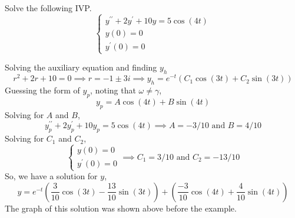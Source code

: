 \begin{example}
	Solve the following IVP.
	\begin{equation*}
		\begin{cases}
			y^{\prime\prime} + 2y^{\prime} + 10y = 5\cos{(4t)} \\
			y(0) = 0 \\
			y^\prime(0) = 0
		\end{cases}
	\end{equation*}
\end{example}
\noindent
Solving the auxiliary equation and finding $y_h$
\begin{equation*}
	r^2+2r+10=0 \implies r = -1\pm 3i \implies y_h = e^{-t}\left(C_1\cos{(3t) + C_2\sin{(3t)}}\right)
\end{equation*}
Guessing the form of $y_p$, noting that $\omega \neq \gamma$,
\begin{equation*}
	y_p = A\cos{(4t)} + B\sin{(4t)}
\end{equation*}
Solving for $A$ and $B$,
\begin{equation*}
	y_p^{\prime\prime}+2y_p^\prime+10y_p = 5\cos{(4t)} \implies A=-3/10 \text{ and } B=4/10
\end{equation*}
Solving for $C_1$ and $C_2$,
\begin{equation*}
	\begin{cases}
		y(0) = 0 \\
		y^\prime(0) = 0
	\end{cases} \implies C_1 = 3/10 \text{ and } C_2=-13/10
\end{equation*}
So, we have a solution for $y$,
\begin{equation*}
	y = e^{-t}\left(\frac{3}{10}\cos{(3t)}-\frac{13}{10}\sin{(3t)}\right) + \left(\frac{-3}{10}\cos{(4t)}+\frac{4}{10}\sin{(4t)}\right)
\end{equation*}
The graph of this solution was shown above before the example.